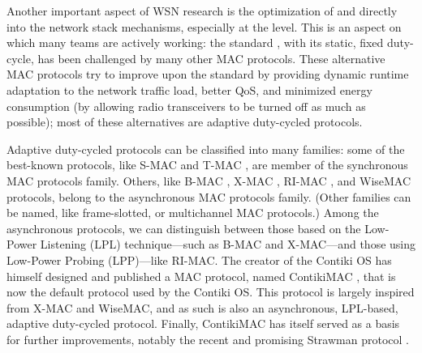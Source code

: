 \documentclass[12pt,a4paper]{article}
\begin{document}

Another important aspect of WSN research is the optimization of
 and  directly into
the network stack mechanisms, especially at the  level. This is an aspect on which many teams are actively working:
the standard  \cite{std802154}, with its
static, fixed duty-cycle, has been challenged by many other MAC protocols.
These alternative MAC protocols try to improve upon the standard by providing
dynamic runtime adaptation to the network traffic load, better QoS, and
minimized energy consumption (by allowing radio transceivers to be turned
off as much as possible); most of these alternatives are adaptive
duty-cycled protocols.

Adaptive duty-cycled protocols can be classified into many families:
some of the best-known protocols, like S-MAC \cite{s-mac} and
T-MAC \cite{t-mac}, are member of the synchronous MAC protocols family.
Others, like B-MAC \cite{b-mac}, X-MAC \cite{x-mac}, RI-MAC \cite{ri-mac},
and WiseMAC \cite{wise-mac} protocols, belong to the asynchronous MAC
protocols family. (Other families can be named, like frame-slotted,
or multichannel MAC protocols.) Among the asynchronous protocols,
we can distinguish between those based on the Low-Power Listening (LPL)
technique---such as B-MAC and X-MAC---and those using Low-Power
Probing (LPP)---like RI-MAC. The creator of the Contiki OS has himself
designed and published a MAC protocol, named ContikiMAC \cite{contiki-mac},
that is now the default protocol used by the Contiki OS. This protocol
is largely inspired from X-MAC and WiseMAC, and as such is also
an asynchronous, LPL-based, adaptive duty-cycled protocol.
Finally, ContikiMAC has itself served as a basis for further
improvements, notably the recent and promising
Strawman protocol \cite{strawman-mac}.
\end{document}
